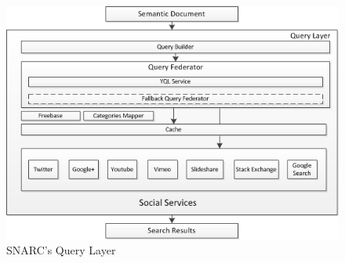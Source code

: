 \documentclass[oribibl]{../../Tools/LaTEX/llncs}
\begin{document}
\begin{figure}[!ht]
  \centering
    \includegraphics[scale=0.75]{architecture_query_layer.png}
  \caption{SNARC's Query Layer}
  \label{fig:architecture_query_layer}
\end{figure}
\end{document}
